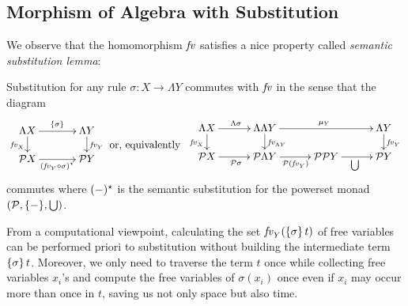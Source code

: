 \documentclass[acmsmall,review]{acmart}\settopmatter{printfolios=true,printccs=false,printacmref=false}
\theoremstyle{acmdefinition}
\begin{document}
\subsection{Morphism of Algebra with Substitution}
We observe that the homomorphism $\mathit{fv}$ satisfies a nice property called \emph{semantic substitution lemma}:
\begin{lemma}\label{lem:substitution-lemma-fv}
  Substitution for any rule $\sigma \colon X \to \Lambda Y$ commutes with $\mathit{fv}$ in the sense that the diagram
  \begin{equation}\label{eq:substitution-lemma}
    \vcenter{
      \xymatrix@C+1em@R-1em{
        \Lambda X \ar[r]^{\subst{\sigma}} \ar[d]_{\fv_X} & \Lambda Y \ar[d]^{\fv_Y} \\
        \power  X \ar[r]_{\left(\fv_Y \comp \sigma\right)^\star} & \power Y
      }
    }
    \;\text{or, equivalently }\;
    \vcenter{
      \xymatrix@C+.5em@R-1em{
        \Lambda X \ar[d]_{\fv_X} \ar[r]^{\Lambda \sigma} & \Lambda \Lambda Y \ar[rr]^{\mu_Y} \ar[d]^{\fv_{\Lambda Y}} & & \Lambda Y \ar[d]^{\fv_Y} \\
        \power  X \ar[r]_{\power \sigma} & \power  \Lambda Y \ar[r]_{\power(\fv_Y)} & \power \power Y \ar[r]_{\bigcup} & \power Y
      }
    }
  \end{equation}
  commutes where $({-})^\star$ is the semantic substitution for the powerset monad $(\mathcal{P}, \{{-}\}, \bigcup)$. 
\end{lemma}
From a computational viewpoint, calculating the set $\mathit{fv}_Y(\left\{{\sigma}\right\} t)$ of free variables can be performed priori to substitution without building the intermediate term $\left\{{\sigma}\right\} t$. 
Moreover, we only need to traverse the term $t$ once while collecting free variables $x_i$'s and compute the free variables of $\sigma(x_i)$ once even if $x_i$ may occur more than once in $t$, saving us not only space but also time.
\end{document}
